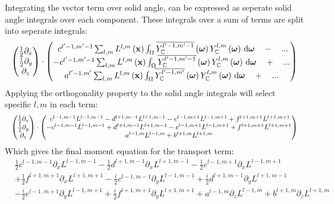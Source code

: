 Integrating the vector term over solid angle, can be expressed as seperate solid angle integrals over each component. These integrals over a sum of terms are split into seperate integrals:
\begin{align*}
\begin{pmatrix}
\frac{1}{2}\partial_x\\
\frac{i}{2}\partial_y\\
\partial_z
\end{pmatrix}
\cdot
\begin{pmatrix}
\ c^{l'-1, m'-1}\sum_{l,m}{L^{l,m}\left(\boldsymbol{\mathbf{x}}\right )\int_\Omega{\overline{Y_{\mathbb{C}}^{l'-1,m'-1}}\left(\boldsymbol{\mathbf{\omega}}\right)Y_{\mathbb{C}}^{l,m}\left(\boldsymbol{\mathbf{\omega}}\right)\,\mathrm{d}\boldsymbol{\mathbf{\omega}}}} \quad - \quad ...\\
-c^{l'-1, m'-1}\sum_{l,m}{L^{l,m}\left(\boldsymbol{\mathbf{x}}\right )\int_\Omega{\overline{Y_{\mathbb{C}}^{l'-1,m'-1}}\left(\boldsymbol{\mathbf{\omega}}\right)Y_{\mathbb{C}}^{l,m}\left(\boldsymbol{\mathbf{\omega}}\right)\,\mathrm{d}\boldsymbol{\mathbf{\omega}}}} \quad + \quad ... \\
a^{l'-1, m'}\sum_{l,m}{L^{l,m}\left(\boldsymbol{\mathbf{x}}\right )\int_\Omega{\overline{Y_{\mathbb{C}}^{l'-1,m'}}\left(\boldsymbol{\mathbf{\omega}}\right)Y_{\mathbb{C}}^{l,m}\left(\boldsymbol{\mathbf{\omega}}\right)\,\mathrm{d}\boldsymbol{\mathbf{\omega}}}} \quad + \quad ...
\end{pmatrix}
\end{align*}
Applying the orthogonality property to the solid angle integrals will select specific $l,m$ in each term:
\begin{equation*}
\resizebox{1.0\hsize}{!}{$
\begin{pmatrix}
\frac{1}{2}\partial_x\\
\frac{i}{2}\partial_y\\
\partial_z
\end{pmatrix}
\cdot
\begin{pmatrix}
\ c^{l-1, m-1}L^{l-1,m-1} - d^{l+1, m-1}L^{l+1,m-1} - e^{l-1, m+1}L^{l-1,m+1} + f^{l+1, m+1}L^{l+1,m+1}\\
-c^{l-1, m-1}L^{l-1,m-1} + d^{l+1, m-1}L^{l+1,m-1} - e^{l-1, m+1}L^{l-1,m+1} + f^{l+1, m+1}L^{l+1,m+1} \\
a^{l-1, m}L^{l-1,m}+b^{l+1, m}L^{l+1,m}
\end{pmatrix}
$}
\end{equation*}
Which gives the final moment equation for the transport term:
\begin{align}
&
\frac{1}{2}c^{l-1, m-1}\partial_x L^{l-1,m-1}
-\frac{1}{2}d^{l+1, m-1}\partial_x L^{l+1,m-1}
-\frac{1}{2}e^{l-1, m+1}\partial_x L^{l-1,m+1}
\nonumber
\\
&
+\frac{1}{2}f^{l+1, m+1}\partial_x L^{l+1,m+1}
-\frac{i}{2}c^{l-1, m-1}\partial_y L^{l-1,m-1}
+\frac{i}{2}d^{l+1, m-1}\partial_y L^{l+1,m-1}
\nonumber
\\
&
-\frac{i}{2}e^{l-1, m+1}\partial_y L^{l-1,m+1}
+\frac{i}{2}f^{l+1, m+1}\partial_y L^{l+1,m+1}
+
a^{l-1, m}\partial_z L^{l-1,m}+b^{l+1, m}\partial_z L^{l+1,m}
\label{eq:sh_complex_transport}
\end{align}

